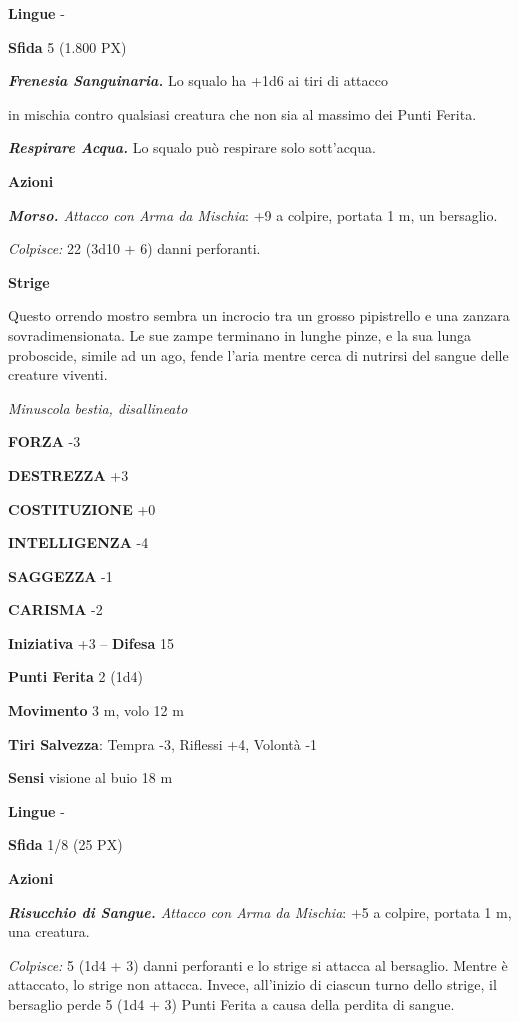 \begin{multicols}{2}
	\textbf{Lingue} -

	\textbf{Sfida} 5 (1.800 PX)

	\textit{\textbf{Frenesia Sanguinaria.}} Lo squalo ha +1d6 ai tiri di attacco

	in mischia contro qualsiasi creatura che non sia al massimo dei Punti Ferita.

	\textit{\textbf{Respirare Acqua.}} Lo squalo può respirare solo sott'acqua.

	\textbf{Azioni}

	\textit{\textbf{Morso.} Attacco con Arma da Mischia}: +9 a colpire, portata 1 m, un bersaglio.

	\textit{Colpisce:} 22 (3d10 + 6) danni perforanti.

	\medskip\textbf{Strige}

	Questo orrendo mostro sembra un incrocio tra un grosso pipistrello e una zanzara sovradimensionata. Le sue zampe terminano in lunghe pinze, e la sua lunga proboscide, simile ad un ago, fende l'aria mentre cerca di nutrirsi del sangue delle creature viventi.

	\textit{Minuscola bestia, disallineato}

	\textbf{FORZA} -3

	\textbf{DESTREZZA} +3

	\textbf{COSTITUZIONE} +0

	\textbf{INTELLIGENZA} -4

	\textbf{SAGGEZZA} -1

	\textbf{CARISMA} -2

	\textbf{Iniziativa} +3 -- \textbf{Difesa} 15

	\textbf{Punti Ferita} 2 (1d4)

	\textbf{Movimento} 3 m, volo 12 m

	\textbf{Tiri Salvezza}: Tempra -3, Riflessi +4, Volontà -1

	\textbf{Sensi} visione al buio 18 m

	\textbf{Lingue} -

	\textbf{Sfida} 1/8 (25 PX)

	\textbf{Azioni}

	\textit{\textbf{Risucchio di Sangue.} Attacco con Arma da Mischia}: +5 a colpire, portata 1 m, una creatura.

	\textit{Colpisce:} 5 (1d4 + 3) danni perforanti e lo strige si attacca al bersaglio. Mentre è attaccato, lo strige non attacca. Invece, all'inizio di ciascun turno dello strige, il bersaglio perde 5 (1d4 + 3) Punti Ferita a causa della perdita di sangue.


\end{multicols}
